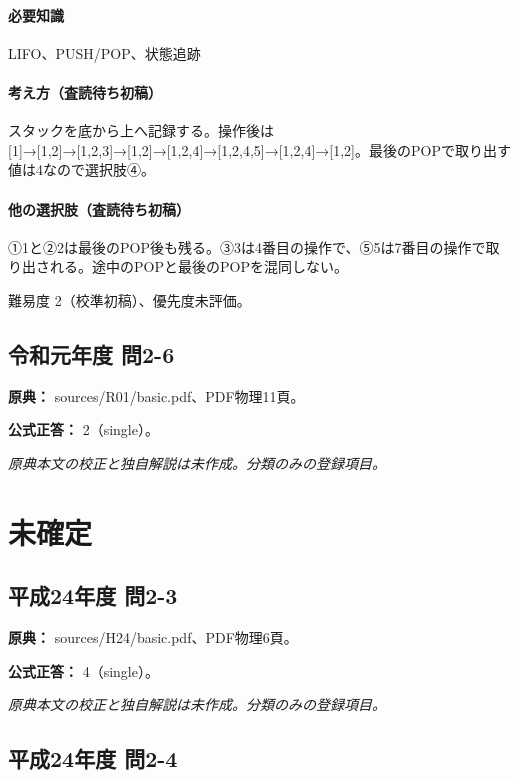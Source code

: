\paragraph{必要知識} LIFO、PUSH/POP、状態追跡

\paragraph{考え方（査読待ち初稿）} スタックを底から上へ記録する。操作後は [1]→[1,2]→[1,2,3]→[1,2]→[1,2,4]→[1,2,4,5]→[1,2,4]→[1,2]。最後のPOPで取り出す値は4なので選択肢④。

\paragraph{他の選択肢（査読待ち初稿）} ①1と②2は最後のPOP後も残る。③3は4番目の操作で、⑤5は7番目の操作で取り出される。途中のPOPと最後のPOPを混同しない。

\par 難易度 2（校準初稿）、優先度未評価。

\subsection{令和元年度 問2-6}
\label{q:r01-reg-basic-2-6}

\noindent\textbf{原典：} sources/R01/basic.pdf、PDF物理11頁。

\textbf{公式正答：} 2（single）。

\par\textit{原典本文の校正と独自解説は未作成。分類のみの登録項目。}

\section{未確定}

\subsection{平成24年度 問2-3}
\label{q:h24-reg-basic-2-3}

\noindent\textbf{原典：} sources/H24/basic.pdf、PDF物理6頁。

\textbf{公式正答：} 4（single）。

\par\textit{原典本文の校正と独自解説は未作成。分類のみの登録項目。}

\subsection{平成24年度 問2-4}
\label{q:h24-reg-basic-2-4}

